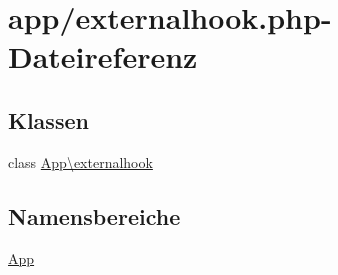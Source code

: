 \hypertarget{externalhook_8php}{}\section{app/externalhook.php-\/\+Dateireferenz}
\label{externalhook_8php}
\subsection*{Klassen}
\begin{DoxyCompactItemize}
\item 
class \hyperlink{classApp_1_1externalhook}{App\textbackslash{}externalhook}
\end{DoxyCompactItemize}
\subsection*{Namensbereiche}
\begin{DoxyCompactItemize}
\item 
 \hyperlink{namespaceApp}{App}
\end{DoxyCompactItemize}
